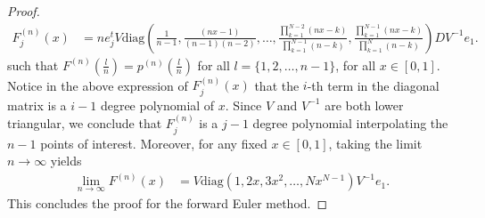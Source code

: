 \documentclass{article}
\theoremstyle{definition}
\newcommand{\pr}[1]{ \left( #1 \right) }
\begin{document}
\begin{proof}
     \begin{align*}
         F_j^{(n)}(x) &= n e_j^{t} V \text{diag}\pr{ \frac{1}{n-1}, \frac{ \pr{ nx-1}}{(n-1)(n-2)}, \dots, \frac{\prod_{k=1}^{N-2}\pr{ nx - k } }{{\prod_{k=1}^{N-1}\pr{ n - k }}}, \frac{\prod_{k=1}^{N-1}\pr{ nx - k } }{{\prod_{k=1}^{N}\pr{ n - k }}}} D V^{-1} e_1.
     \end{align*}
    such that $F^{(n)}\pr{\frac{l}{n}} = p^{(n)}\pr{\frac{l}{n}}$ for all $l = \{1,2, \dots, n-1\}$, for all $x \in [0,1]$.      
     Notice in the above expression of $F_j^{(n)}(x)$ that the $i$-th term in the diagonal matrix is a $i-1$ degree polynomial of $x$. Since $V$ and $V^{-1}$ are both lower triangular, we conclude that $F_j^{(n)}$ is a $j-1$ degree polynomial interpolating the $n-1$ points of interest. 
    Moreover, for any fixed $x \in [0,1]$, taking the limit $n \to \infty$ yields
    \begin{align} \label{eqref:F^n_limit}
         \lim_{n \to \infty} F^{(n)}(x) &= V \text{diag} \pr{ 1, 2x, 3x^2, \dots, Nx^{N-1}} V^{-1} e_1.
     \end{align}
     This concludes the proof for the forward Euler method. 


\end{proof}
\end{document}
